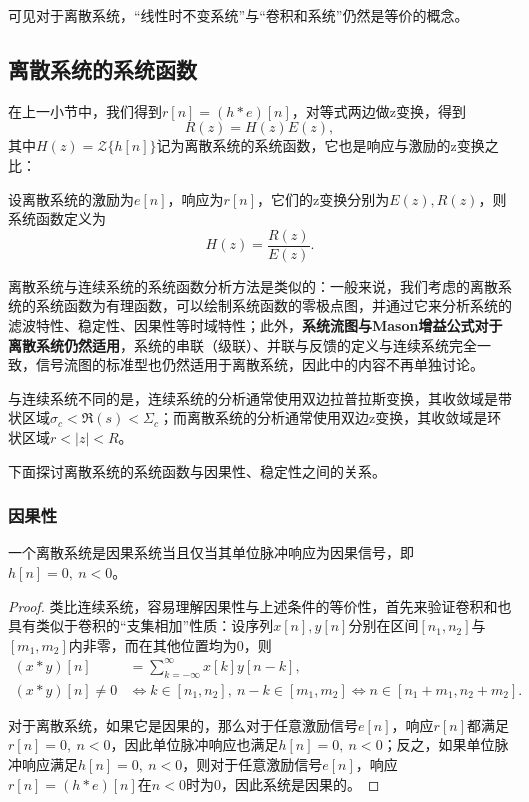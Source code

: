 可见对于离散系统，“线性时不变系统”与“卷积和系统”仍然是等价的概念。

\subsection{离散系统的系统函数}\label{sub:discrete_system_function}

在上一小节中，我们得到$r[n]=(h*e)[n]$，对等式两边做z变换，得到
\begin{equation}
    R(z)=H(z)E(z),
\end{equation}
其中$H(z)=\mathcal{Z}\{h[n]\}$记为离散系统的系统函数，它也是响应与激励的z变换之比：
\begin{definition}[离散系统的系统函数]
    设离散系统的激励为$e[n]$，响应为$r[n]$，它们的z变换分别为$E(z),R(z)$，则系统函数定义为
    \begin{equation}
        H(z)=\frac{R(z)}{E(z)}.
    \end{equation}
\end{definition}

离散系统与连续系统的系统函数分析方法是类似的：一般来说，我们考虑的离散系统的系统函数为有理函数，可以绘制系统函数的零极点图，并通过它来分析系统的滤波特性、稳定性、因果性等时域特性；此外，\textbf{系统流图与Mason增益公式对于离散系统仍然适用}，系统的串联（级联）、并联与反馈的定义与连续系统完全一致，信号流图的标准型也仍然适用于离散系统，因此中的内容不再单独讨论。

与连续系统不同的是，连续系统的分析通常使用双边拉普拉斯变换，其收敛域是带状区域$\sigma_c<\Re(s)<\Sigma_c$；而离散系统的分析通常使用双边z变换，其收敛域是环状区域$r<|z|<R$。%

下面探讨离散系统的系统函数与因果性、稳定性之间的关系。

\subsubsection{因果性}

\begin{proposition}[因果性的时域判则]
    一个离散系统是因果系统当且仅当其单位脉冲响应为因果信号，即$h[n]=0,\ n<0$。
\end{proposition}
\begin{proof}
    类比连续系统，容易理解因果性与上述条件的等价性，首先来验证卷积和也具有类似于卷积的“支集相加”性质：设序列$x[n],y[n]$分别在区间$[n_1,n_2]$与$[m_1,m_2]$内非零，而在其他位置均为$0$，则
    \begin{align}
        (x*y)[n]&=\sum_{k=-\infty}^{\infty}x[k]y[n-k], \\
        (x*y)[n]\neq 0&\iff k\in[n_1,n_2],\ n-k\in[m_1,m_2]\iff n\in[n_1+m_1,n_2+m_2].
    \end{align}

    对于离散系统，如果它是因果的，那么对于任意激励信号$e[n]$，响应$r[n]$都满足$r[n]=0,\ n<0$，因此单位脉冲响应也满足$h[n]=0,\ n<0$；反之，如果单位脉冲响应满足$h[n]=0,\ n<0$，则对于任意激励信号$e[n]$，响应$r[n]=(h*e)[n]$在$n<0$时为$0$，因此系统是因果的。
\end{proof}

